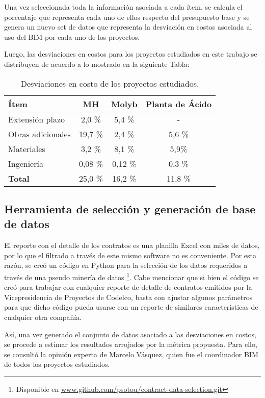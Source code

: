 Una vez seleccionada toda la información asociada a cada ítem, se calcula el porcentaje que representa cada uno de ellos respecto del presupuesto base y se genera un nuevo set de datos que representa la desviación en costos asociada al uso del BIM por cada uno de los proyectos.

Luego, las desviaciones en costos para los proyectos estudiados en este trabajo se distribuyen de acuerdo a lo mostrado en la siguiente Tabla:

\begin{table}[H]
    \centering
    \label{tab.datos_desv_proy}
    \caption{Desviaciones en costo de los proyectos estudiados.}
    \begin{tabular}{lccc}
        \toprule 
        Ítem              & MH      & Molyb   & Planta de Ácido \\
        \midrule
        Extensión plazo   & 2,0 \%  & 5,4 \%  & -       \\
        Obras adicionales & 19,7 \% & 2,4 \%  & 5,6 \%  \\
        Materiales        & 3,2 \%  & 8,1 \%  & 5,9\%   \\       
        Ingeniería        & 0,08 \% & 0,12 \% & 0,3 \%  \\
        \textbf{Total}    & 25,0 \% & 16,2 \% & 11,8 \% \\
        \bottomrule
    \end{tabular}
\end{table}

\subsection{Herramienta de selección y generación de base de datos}

El reporte con el detalle de los contratos es una planilla Excel con miles de datos, por lo que el filtrado a través de este mismo software no es conveniente. Por esta razón, se creó un código en Python para la selección de los datos requeridos a través de una pseudo minería de datos \footnote{Disponible en \url{www.github.com/psotou/contract-data-selection.git} }. Cabe mencionar que si bien el código se creó para trabajar con cualquier reporte de detalle de contratos emitidos por la Vicepresidencia de Proyectos de Codelco, basta con ajustar algunos parámetros para que dicho código pueda usarse con un reporte de similares características de cualquier otra compañía.

Así, una vez generado el conjunto de datos asociado a las desviaciones en costos, se procede a estimar los resultados arrojados por la métrica propuesta. Para ello, se consultó la opinión experta de Marcelo Vásquez, quien fue el coordinador BIM de todos los proyectos estudiados. 

